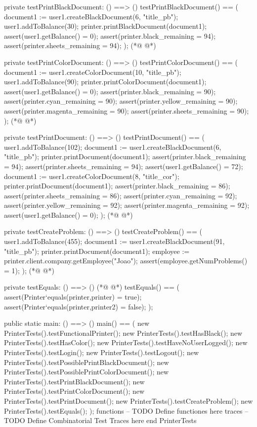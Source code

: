 \begin{vdmpp}[breaklines=true]
private testPrintBlackDocument: () ==> ()
testPrintBlackDocument() ==
(
document1 := user1.createBlackDocument(6, "title_pb");
user1.addToBalance(30);
printer.printBlackDocument(document1);
assert(user1.getBalance() = 0);
assert(printer.black_remaining = 94);
assert(printer.sheets_remaining = 94);
);
(*@
\label{testPrintColorDocument:99}
@*)

private testPrintColorDocument: () ==> ()
testPrintColorDocument() ==
(
document1 := user1.createColorDocument(10, "title_pb");
user1.addToBalance(90);
printer.printColorDocument(document1);
assert(user1.getBalance() = 0);
assert(printer.black_remaining = 90);
assert(printer.cyan_remaining = 90);
assert(printer.yellow_remaining = 90);
assert(printer.magenta_remaining = 90);
assert(printer.sheets_remaining = 90);
);
(*@
\label{testPrintDocument:113}
@*)

private testPrintDocument: () ==> ()
testPrintDocument() == (
user1.addToBalance(102);
document1 := user1.createBlackDocument(6, "title_pb");
printer.printDocument(document1);
assert(printer.black_remaining = 94);
assert(printer.sheets_remaining = 94);
assert(user1.getBalance() = 72);
document1 := user1.createColorDocument(8, "title_cor");
printer.printDocument(document1);
assert(printer.black_remaining = 86);
assert(printer.sheets_remaining = 86);
assert(printer.cyan_remaining = 92);
assert(printer.yellow_remaining = 92);
assert(printer.magenta_remaining = 92);
assert(user1.getBalance() = 0);
);
(*@
\label{testCreateProblem:131}
@*)

private testCreateProblem: () ==> ()
testCreateProblem() == (
user1.addToBalance(455);
document1 := user1.createBlackDocument(91, "title_pb");
printer.printDocument(document1);
employee := printer.client.company.getEmployee("Joao");
assert(employee.getNumProblems() = 1);
);
(*@
\label{testEquals:140}
@*)

private testEquals: () ==> ()
(*@
\label{main:142}
@*)
testEquals() ==
(
assert(Printer`equals(printer,printer) = true);
assert(Printer`equals(printer,printer2) = false);
);

public static main: () ==> ()
 main() ==
 (
  new PrinterTests().testFunctionalPrinter();
  new PrinterTests().testHasBlack();
  new PrinterTests().testHasColor();
  new PrinterTests().testHaveNoUserLogged();
  new PrinterTests().testLogin();
  new PrinterTests().testLogout();
  new PrinterTests().testPossiblePrintBlackDocument();
  new PrinterTests().testPossiblePrintColorDocument();
  new PrinterTests().testPrintBlackDocument();
  new PrinterTests().testPrintColorDocument();
  new PrinterTests().testPrintDocument();
  new PrinterTests().testCreateProblem();
  new PrinterTests().testEquals();
 );
functions
-- TODO Define functiones here
traces
-- TODO Define Combinatorial Test Traces here
end PrinterTests
\end{vdmpp}
